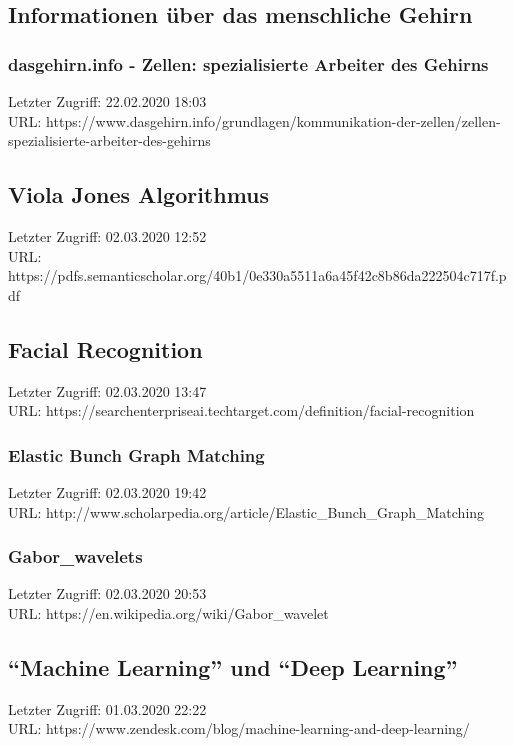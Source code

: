 \subsection{Informationen über das menschliche Gehirn}
\label{subsec:Informationen_ueber_das_menschliche_Gehirn}
	\subsubsection{dasgehirn.info - Zellen: spezialisierte Arbeiter des Gehirns}
	\label{subsubsec:dasgehirn:Zellen-Arbeiter_Des_Gehrins}
	Letzter Zugriff: 22.02.2020 18:03\\
	URL: https://www.dasgehirn.info/grundlagen/kommunikation-der-zellen/zellen-spezialisierte-arbeiter-des-gehirns

\subsection{Viola Jones Algorithmus}
\label{algoryhtm:viola_jones}
	Letzter Zugriff: 02.03.2020 12:52\\
	URL: https://pdfs.semanticscholar.org/40b1/0e330a5511a6a45f42c8b86da222504c717f.pdf

\subsection{Facial Recognition}
\label{source:searchenterpriseai:facial_recognition}
	Letzter Zugriff: 02.03.2020 13:47\\
	URL: https://searchenterpriseai.techtarget.com/definition/facial-recognition

	\subsubsection{Elastic Bunch Graph Matching}
	\label{scholarpedia:ebgm}
	Letzter Zugriff: 02.03.2020 19:42\\
	URL: http://www.scholarpedia.org/article/Elastic\_Bunch\_Graph_Matching

	\subsubsection{Gabor_wavelets}
	\label{Gabor_wavelets}
	Letzter Zugriff: 02.03.2020 20:53\\
	URL: https://en.wikipedia.org/wiki/Gabor\_wavelet

\subsection{\enquote{Machine Learning} und \enquote{Deep Learning}}
\label{subsec:machine_learning_and_deep_learning}
	Letzter Zugriff: 01.03.2020 22:22\\
	URL: https://www.zendesk.com/blog/machine-learning-and-deep-learning/

